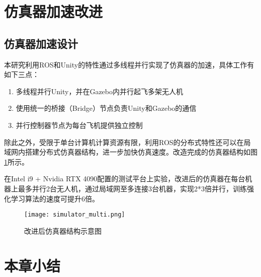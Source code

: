 \section{仿真器加速改进}
\subsection{仿真器加速设计}
本研究利用ROS和Unity的特性通过多线程并行实现了仿真器的加速，具体工作有如下三点：
\begin{enumerate}
  \item 多线程并行Unity，并在Gazebo内并行起飞多架无人机
  \item 使用统一的桥接（Bridge）节点负责Unity和Gazebo的通信
  \item 并行控制器节点为每台飞机提供独立控制
\end{enumerate}

除此之外，受限于单台计算机计算资源有限，利用ROS的分布式特性还可以在局域网内搭建分布式仿真器结构，进一步加快仿真速度。改造完成的仿真器结构如图\ref{fig_simulator_multi}所示。

在Intel i9 + Nvidia RTX 4090配置的测试平台上实验，改进后的仿真器在每台机器上最多并行2台无人机，通过局域网至多连接3台机器，实现2*3倍并行，训练强化学习算法的速度可提升6倍。
\begin{figure}
  \centering
  \texttt{[image: simulator\_multi.png]}
  \caption{改进后仿真器结构示意图}
  \label{fig_simulator_multi}
\end{figure}

\section{本章小结}





